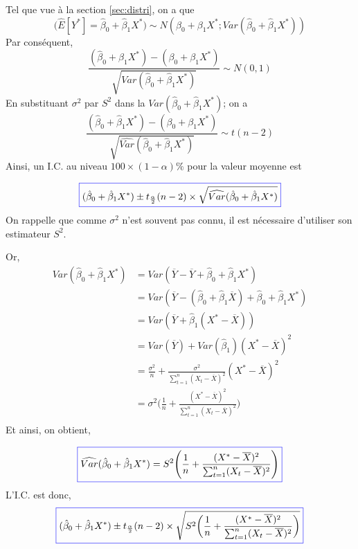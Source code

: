 \documentclass[11pt,french]{report}
\begin{document}
Tel que vue à la section \ref{sec:distri}, on a que
$$
\big(\widehat{E}[Y^*] = \hat{\beta}_0 + \hat{\beta}_1X^* \big) \sim N(\beta_0 + \beta_1X^*; Var( \hat{\beta}_0 + \hat{\beta}_1X^*))
$$
Par conséquent,
$$
\frac{(\hat{\beta}_0 + \hat{\beta}_1X^*) - (\beta_0 + \beta_1X^*)}{\sqrt{Var( \hat{\beta}_0 + \hat{\beta}_1X^*)}} \sim N(0,1)
$$
En substituant $\sigma^2$ par $S^2$ dans la $Var(\hat{\beta}_0 + \hat{\beta}_1X^*)$; on a
$$
\frac{(\hat{\beta}_0 + \hat{\beta}_1X^*) - (\beta_0 + \beta_1X^*)}{\sqrt{\widehat{Var}( \hat{\beta}_0 + \hat{\beta}_1X^*)}} \sim t(n-2)
$$
Ainsi, un I.C. au niveau $100 \times(1 -\alpha)\%$ pour la valeur moyenne est

\begin{equation}
\label{eq:IC}
\color{blue}
\boxed{\color{black}
(\hat{\beta}_0 + \hat{\beta}_1X^*)  \pm t_{\frac{\alpha}{2}}(n-2)\times \sqrt{\widehat{Var}( \hat{\beta}_0 + \hat{\beta}_1X^*)}
}
\end{equation}
On rappelle que comme $\sigma^2$ n'est souvent pas connu, il est nécessaire d'utiliser son estimateur $S^2$.

Or, 
\begin{align*}
Var(\hat{\beta}_0 + \hat{\beta}_1X^*)  &= Var(\overline{Y} - \overline{Y} + \hat{\beta}_0 + \hat{\beta}_1X^*) \\
&= Var(\overline{Y} - (\hat{\beta}_0 + \hat{\beta}_1\overline{X}) + \hat{\beta}_0 + \hat{\beta}_1X^*) \\
&= Var(\overline{Y} + \hat{\beta}_1( X^* - \overline{X})) \\
&= Var(\overline{Y}) + Var(\hat{\beta}_1)( X^* - \overline{X})^2 \\
&= \frac{\sigma^2}{n} + \frac{\sigma^2}{\sum_{t=1}^n (X_t - \overline{X})^2}(X^* - \overline{X})^2 \\
&=\sigma^2 \Bigg(\frac{1}{n} + \frac{(X^* - \overline{X})^2 }{\sum_{t=1}^n (X_t - \overline{X})^2}\Bigg)  \\
\end{align*}
Et ainsi, on obtient,

\begin{equation}
\label{eq:var*}
\color{blue}
\boxed{\color{black}
\widehat{Var}(\hat{\beta}_0 + \hat{\beta}_1X^*) = S^2 \Bigg(\frac{1}{n} + \frac{(X^* - \overline{X})^2 }{\sum_{t=1}^n (X_t - \overline{X})^2}\Bigg)  
}
\end{equation}
L'I.C. est donc,
\begin{equation}
\label{eq:IC2}
\color{blue}
\boxed{\color{black}
(\hat{\beta}_0 + \hat{\beta}_1X^*) \pm t_{\frac{\alpha}{2}}(n-2)\times \sqrt{S^2 \bigg(\frac{1}{n} + \frac{(X^* - \overline{X})^2 }{\sum_{t=1}^n (X_t - \overline{X})^2}\bigg)}  
}
\end{equation}
\end{document}
